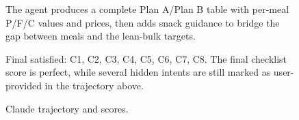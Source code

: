 \begin{figure}[h]
{    
    The agent produces a complete Plan A/Plan B table with per-meal P/F/C values and prices, then adds snack guidance to bridge the gap between meals and the lean-bulk targets.

    \vspace{5pt}
    \hspace{3pt}

    \vspace{3pt}
    \noindent{}
    Final satisfied: C1, C2, C3, C4, C5, C6, C7, C8.
    The final checklist score is perfect, while several hidden intents are still marked as user-provided in the trajectory above.
    }
    \caption{Claude trajectory and scores.}
    \label{fig:case_zhangshunkai_1_claude_trajectory}
\end{figure}
